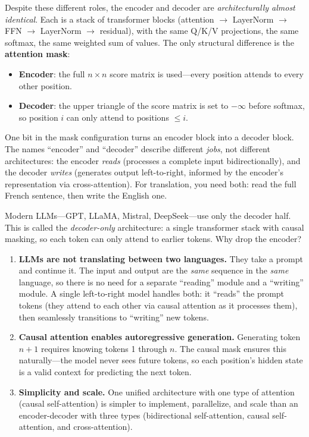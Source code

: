 Despite these different roles, the encoder and decoder are \emph{architecturally almost identical}. Each is a stack of transformer blocks (attention $\to$ LayerNorm $\to$ FFN $\to$ LayerNorm $\to$ residual), with the same Q/K/V projections, the same softmax, the same weighted sum of values. The only structural difference is the \textbf{attention mask}:
\begin{itemize}
    \item \textbf{Encoder}: the full $n \times n$ score matrix is used---every position attends to every other position.
    \item \textbf{Decoder}: the upper triangle of the score matrix is set to $-\infty$ before softmax, so position $i$ can only attend to positions $\leq i$.
\end{itemize}
One bit in the mask configuration turns an encoder block into a decoder block. The names ``encoder'' and ``decoder'' describe different \emph{jobs}, not different architectures: the encoder \emph{reads} (processes a complete input bidirectionally), and the decoder \emph{writes} (generates output left-to-right, informed by the encoder's representation via cross-attention). For translation, you need both: read the full French sentence, then write the English one.

Modern LLMs---GPT, LLaMA, Mistral, DeepSeek---use only the decoder half. This is called the \emph{decoder-only} architecture: a single transformer stack with causal masking, so each token can only attend to earlier tokens. Why drop the encoder?
\begin{enumerate}
    \item \textbf{LLMs are not translating between two languages.} They take a prompt and continue it. The input and output are the \emph{same} sequence in the \emph{same} language, so there is no need for a separate ``reading'' module and a ``writing'' module. A single left-to-right model handles both: it ``reads'' the prompt tokens (they attend to each other via causal attention as it processes them), then seamlessly transitions to ``writing'' new tokens.
    \item \textbf{Causal attention enables autoregressive generation.} Generating token $n{+}1$ requires knowing tokens 1 through $n$. The causal mask ensures this naturally---the model never sees future tokens, so each position's hidden state is a valid context for predicting the next token.
    \item \textbf{Simplicity and scale.} One unified architecture with one type of attention (causal self-attention) is simpler to implement, parallelize, and scale than an encoder-decoder with three types (bidirectional self-attention, causal self-attention, and cross-attention).
\end{enumerate}

